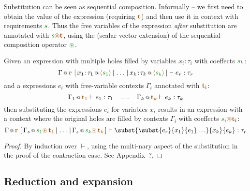 Substitution can be seen as sequential composition. Informally -- we first need to obtain the 
value of the expression (requiring $\aclrd{\textbf{t}}$) and then use it in context with 
requirements $\cclrd{s}$. Thus the free variables of the expression \emph{after} substitution
are annotated with $\cclrd{s} \aseq \aclrd{\textbf{t}}$, using the (scalar-vector extension)
of the sequential composition operator $\cseq$.

\begin{lemma}
Given an expression with multiple holes filled by variables $x_i\!:\!\tau_i$ with coeffects $\cclrd{s_k}$:
%
\begin{equation*}
\coctx{\Gamma}{\aclrd{\textbf{r}}}~[\,\coctx{x_1\!:\!\tau_1}{\alift{\cclrd{s_1}}} \,|\, \ldots \,|\,
  \coctx{x_k\!:\!\tau_k}{\alift{\cclrd{s_k}}}\,] \vdash e_r : \tau_r
\end{equation*}
%
and a expressions $e_i$ with free-variable contexts $\Gamma_i$ annotated with $\aclrd{\mathbf{t_i}}$:
%
\begin{equation*}
\coctx{\Gamma_1}{\aclrd{\textbf{t}_1}} \vdash e_1 : \tau_1 
\quad \ldots \quad
\coctx{\Gamma_k}{\aclrd{\textbf{t}_k}} \vdash e_k : \tau_k
\end{equation*}
%
then substituting the expressions $e_i$ for variables $x_i$ results in an expression with a context
where the original holes are filled by contexts $\Gamma_i$ with coeffects $\cclrd{s_i} \aseq \aclrd{\mathbf{t_i}}$:
%
\begin{equation*}
\coctx{\Gamma}{\aclrd{\textbf{r}}}~[\,\coctx{\Gamma_s}{\cclrd{s_1}\aseq\,\aclrd{\textbf{t}_1}} \,|\, \ldots \,|\, 
  \coctx{\Gamma_s}{\cclrd{s_k}\aseq\,\aclrd{\textbf{t}_k}}\,] \vdash \subst{\subst{e_r}{x_1}{e_1}\ldots}{x_k}{e_k} : \tau_r
\end{equation*}
\end{lemma}
\begin{proof}
By induction over $\vdash$, using the multi-nary aspect of the substitution 
in the proof of the contraction case. See Appendix~?.
\end{proof}

\subsection{Reduction and expansion}


~

